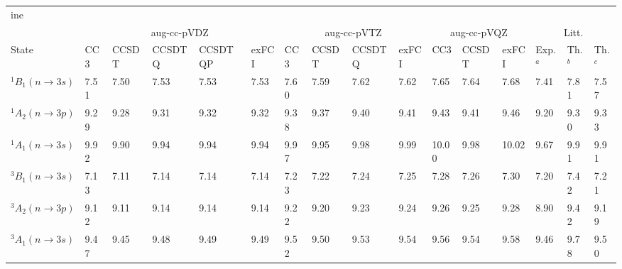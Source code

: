 \newcommand{\TDDFT}{TD-DFT}
\newcommand{\CASSCF}{CASSCF}
\newcommand{\CASPT}{CASPT2}
\newcommand{\ADC}[1]{ADC(#1)}
\newcommand{\CC}[1]{CC#1}
\newcommand{\CCSD}{CCSD}
\newcommand{\EOMCCSD}{EOM-CCSD}
\newcommand{\CCSDT}{CCSDT}
\newcommand{\CCSDTQ}{CCSDTQ}
\newcommand{\CCSDTQP}{CCSDTQP}
\newcommand{\CI}{CI}
\newcommand{\sCI}{sCI}
\newcommand{\exCI}{exFCI}
\newcommand{\FCI}{FCI}

\newcommand{\AVDZ}{aug-cc-pVDZ}
\newcommand{\AVTZ}{aug-cc-pVTZ}
\newcommand{\DAVTZ}{d-aug-cc-pVTZ}
\newcommand{\AVQZ}{aug-cc-pVQZ}
\newcommand{\DAVQZ}{d-aug-cc-pVQZ}
\newcommand{\TAVQZ}{t-aug-cc-pVQZ}
\newcommand{\AVPZ}{aug-cc-pV5Z}
\newcommand{\DAVPZ}{d-aug-cc-pV5Z}
\newcommand{\PopleDZ}{6-31+G(d)}

\newcommand{\pis}{\pi^\star}
\newcommand{\Ryd}{\mathrm{R}}

\begin{tabular}{l|p{.6cm}p{1.1cm}p{1.4cm}p{1.7cm}p{.9cm}|p{.6cm}p{1.1cm}p{1.4cm}p{.9cm}|p{.6cm}p{1.1cm}p{.9cm}|p{.7cm}p{.7cm}p{.7cm}}
	ine 
			 \multicolumn{16}{c}{Water}\\
			& \multicolumn{5}{c}{\AVDZ} & \multicolumn{4}{c}{\AVTZ}& \multicolumn{3}{c}{\AVQZ} & \multicolumn{3}{c}{Litt.}\\
	State 	& {\CC{3}} & {\CCSDT} & {\CCSDTQ} & {\CCSDTQP} & {\exCI} & {\CC{3}} & {\CCSDT} & {\CCSDTQ}  & {\exCI}& {\CC{3}} & {\CCSDT}   & {\exCI} & Exp.$^a$ & Th.$^b$ & Th.$^c$\\
	$^1B_1 (n \rightarrow 3s)$ 	&7.51&7.50&7.53&7.53&7.53	&7.60&7.59&7.62&7.62	&7.65	&7.64	&7.68	&7.41 &7.81&7.57\\
	$^1A_2 (n \rightarrow 3p)$ 	&9.29&9.28&9.31&9.32&9.32	&9.38&9.37&9.40&9.41	&9.43	&9.41	&9.46	&9.20 &9.30&9.33\\
	$^1A_1 (n \rightarrow 3s)$ 	&9.92&9.90&9.94&9.94&9.94	&9.97&9.95&9.98&9.99	&10.00	&9.98	&10.02	&9.67 &9.91&9.91\\
	$^3B_1 (n \rightarrow 3s)$ 	&7.13&7.11&7.14&7.14&7.14	&7.23&7.22&7.24&7.25	&7.28	&7.26	&7.30	&7.20 &7.42&7.21\\
	$^3A_2 (n \rightarrow 3p)$ 	&9.12&9.11&9.14&9.14&9.14	&9.22&9.20&9.23&9.24	&9.26	&9.25	&9.28	&8.90 &9.42&9.19\\
	$^3A_1 (n \rightarrow 3s)$ 	&9.47&9.45&9.48&9.49&9.49	&9.52&9.50&9.53&9.54	&9.56	&9.54	&9.58	&9.46 &9.78&9.50\\
\end{tabular}